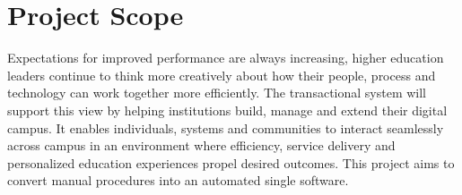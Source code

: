 \section{Project Scope}
Expectations for improved performance are always increasing, higher education leaders continue to think more creatively about how their people, process and technology can work together more efficiently. The transactional system will support this view by helping institutions build, manage and extend their digital campus. It enables individuals, systems and communities to interact seamlessly across campus in an environment where efficiency, service delivery and personalized education experiences propel desired outcomes. This project aims to convert manual procedures into an automated single software.